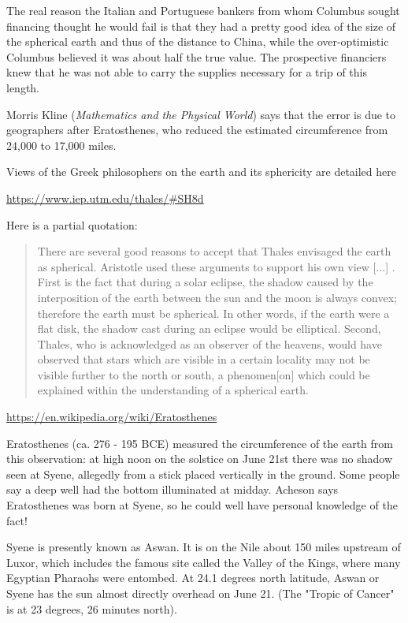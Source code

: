 \documentclass[11pt, oneside]{article}
\begin{document}
The real reason the Italian and Portuguese bankers from whom Columbus sought financing thought he would fail is that they had a pretty good idea of the size of the spherical earth and thus of the distance to China, while the over-optimistic Columbus believed it was about half the true value.  The prospective financiers knew that he was not able to carry the supplies necessary for a trip of this length.

Morris Kline (\emph{Mathematics and the Physical World}) says that the error is due to geographers after Eratosthenes, who reduced the estimated circumference from 24,000 to 17,000 miles.

Views of the Greek philosophers on the earth and its sphericity are detailed here

\url{https://www.iep.utm.edu/thales/#SH8d}

Here is a partial quotation:

\begin{quote}
There are several good reasons to accept that Thales envisaged the earth as spherical. Aristotle used these arguments to support his own view [...] . First is the fact that during a solar eclipse, the shadow caused by the interposition of the earth between the sun and the moon is always convex; therefore the earth must be spherical. In other words, if the earth were a flat disk, the shadow cast during an eclipse would be elliptical. Second, Thales, who is acknowledged as an observer of the heavens, would have observed that stars which are visible in a certain locality may not be visible further to the north or south, a phenomen[on] which could be explained within the understanding of a spherical earth.
\end{quote}

\url{https://en.wikipedia.org/wiki/Eratosthenes}

Eratosthenes (ca. 276 - 195 BCE) measured the circumference of the earth from this observation:  at high noon on the solstice on June 21st there was no shadow seen at Syene, allegedly from a stick placed vertically in the ground.  Some people say a deep well had the bottom illuminated at midday.  Acheson says Eratosthenes was born at Syene, so he could well have personal knowledge of the fact!

Syene is presently known as Aswan.  It is on the Nile about 150 miles upstream of Luxor, which includes the famous site called the Valley of the Kings, where many Egyptian Pharaohs were entombed.  At 24.1 degrees north latitude, Aswan or Syene has the sun almost directly overhead on June 21.  (The "Tropic of Cancer" is at 23 degrees, 26 minutes north).
\end{document}
